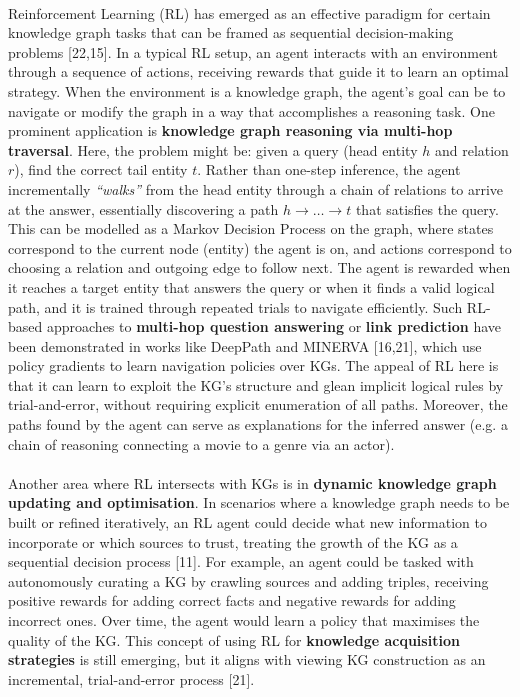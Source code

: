         \paragraph{} Reinforcement Learning (RL) has emerged as an effective paradigm for certain knowledge graph tasks that can be framed as sequential decision-making problems [22,15]. In a typical RL setup, an agent interacts with an environment through a sequence of actions, receiving rewards that guide it to learn an optimal strategy. When the environment is a knowledge graph, the agent’s goal can be to navigate or modify the graph in a way that accomplishes a reasoning task. One prominent application is \textbf{knowledge graph reasoning via multi-hop traversal}. Here, the problem might be: given a query (head entity $h$ and relation $r$), find the correct tail entity $t$. Rather than one-step inference, the agent incrementally \textit{“walks”} from the head entity through a chain of relations to arrive at the answer, essentially discovering a path $h \rightarrow \dots \rightarrow t$ that satisfies the query. This can be modelled as a Markov Decision Process on the graph, where states correspond to the current node (entity) the agent is on, and actions correspond to choosing a relation and outgoing edge to follow next. The agent is rewarded when it reaches a target entity that answers the query or when it finds a valid logical path, and it is trained through repeated trials to navigate efficiently. Such RL-based approaches to \textbf{multi-hop question answering} or \textbf{link prediction} have been demonstrated in works like DeepPath and MINERVA [16,21], which use policy gradients to learn navigation policies over KGs. The appeal of RL here is that it can learn to exploit the KG’s structure and glean implicit logical rules by trial-and-error, without requiring explicit enumeration of all paths. Moreover, the paths found by the agent can serve as explanations for the inferred answer (e.g. a chain of reasoning connecting a movie to a genre via an actor).

        \newpage
        \paragraph{} Another area where RL intersects with KGs is in\textbf{ dynamic knowledge graph updating and optimisation}. In scenarios where a knowledge graph needs to be built or refined iteratively, an RL agent could decide what new information to incorporate or which sources to trust, treating the growth of the KG as a sequential decision process [11]. For example, an agent could be tasked with autonomously curating a KG by crawling sources and adding triples, receiving positive rewards for adding correct facts and negative rewards for adding incorrect ones. Over time, the agent would learn a policy that maximises the quality of the KG. This concept of using RL for \textbf{knowledge acquisition strategies} is still emerging, but it aligns with viewing KG construction as an incremental, trial-and-error process [21].

